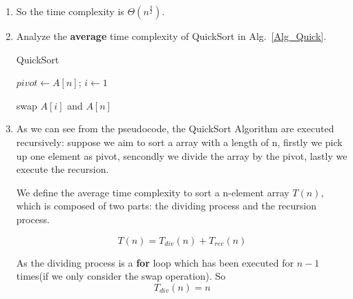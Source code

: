 \documentclass[12pt,a4paper]{article}
\makeatletter
\newtheorem*{solution}{Solution}
\theoremstyle{definition}
\renewenvironment{solution}[1][Solution] {\par\pushQED{\qed}\normalfont\topsep6\p@\@plus6\p@\relax\trivlist\item[\hskip\labelsep\bfseries#1\@addpunct{.}]\ignorespaces}{\popQED\endtrivlist\@endpefalse} \makeatother
\makeatother
\begin{document}
\begin{enumerate}
\begin{solution}
      So the time complexity is $\Theta({n^{\frac{3}{2}}})$.

   \end{solution}

    \item
    Analyze the \textbf{average} time complexity of QuickSort in Alg.~\ref{Alg_Quick}.

    \begin{minipage}[t]{0.8\textwidth}
    \begin{algorithm}[H]

      \BlankLine
      \caption{QuickSort}\label{Alg_Quick}


      $pivot \leftarrow A[n]$; $i \leftarrow 1$\;

      swap $A[i]$ and $A[n]$\;
    \end{algorithm}
    \end{minipage}

   \begin{solution}
           As we can see from the pseudocode, the QuickSort Algorithm are 
           executed recursively: suppose we aim to sort a array with a length of n, 
           firstly we pick up one element as pivot, sencondly we divide the array 
           by the pivot, lastly we execute the recursion.

           We define the average time complexity to sort a n-element array $T(n)$, which is composed of 
           two parts: the dividing process and the recursion process.

           \begin{equation*}
               T(n) = T_{div}(n) + T_{rec}(n)
           \end{equation*}
           
           As the dividing process is a \textbf{for} loop which has been executed for $n - 1$ times(if we only consider the swap operation). So
           \begin{equation*}
               T_{div}(n) = n 
           \end{equation*}


\end{solution}
\end{enumerate}
\end{document}
